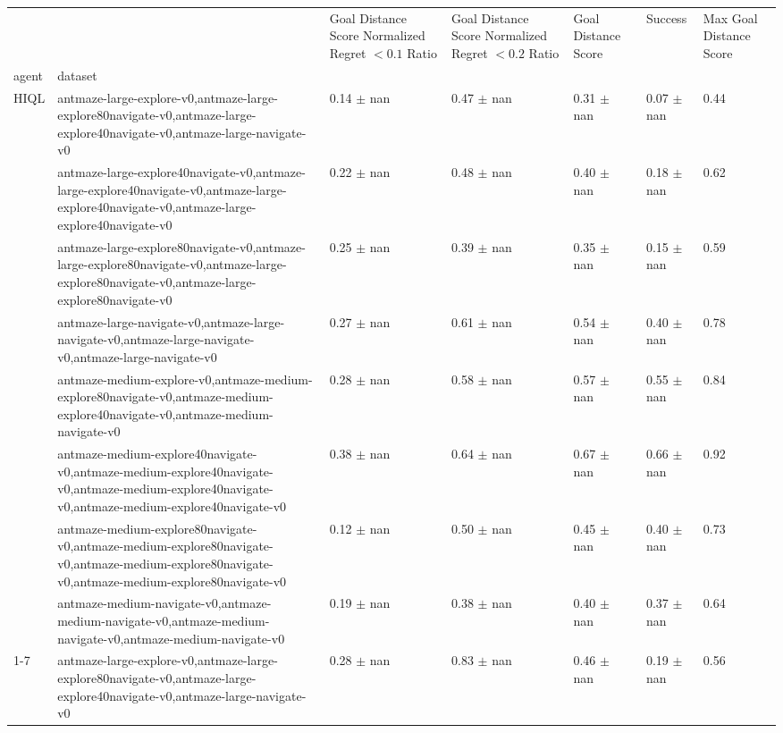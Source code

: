 \begin{tabular}{lllllll}
\toprule
 &  & Goal Distance Score Normalized Regret $< 0.1$ Ratio & Goal Distance Score Normalized Regret $< 0.2$ Ratio & Goal Distance Score & Success & Max Goal Distance Score \\
agent & dataset &  &  &  &  &  \\
\midrule
\multirow[t]{8}{*}{HIQL} & antmaze-large-explore-v0,antmaze-large-explore80navigate-v0,antmaze-large-explore40navigate-v0,antmaze-large-navigate-v0 & 0.14 $\pm$ nan & 0.47 $\pm$ nan & 0.31 $\pm$ nan & 0.07 $\pm$ nan & 0.44 \\
 & antmaze-large-explore40navigate-v0,antmaze-large-explore40navigate-v0,antmaze-large-explore40navigate-v0,antmaze-large-explore40navigate-v0 & 0.22 $\pm$ nan & 0.48 $\pm$ nan & 0.40 $\pm$ nan & 0.18 $\pm$ nan & 0.62 \\
 & antmaze-large-explore80navigate-v0,antmaze-large-explore80navigate-v0,antmaze-large-explore80navigate-v0,antmaze-large-explore80navigate-v0 & 0.25 $\pm$ nan & 0.39 $\pm$ nan & 0.35 $\pm$ nan & 0.15 $\pm$ nan & 0.59 \\
 & antmaze-large-navigate-v0,antmaze-large-navigate-v0,antmaze-large-navigate-v0,antmaze-large-navigate-v0 & 0.27 $\pm$ nan & 0.61 $\pm$ nan & 0.54 $\pm$ nan & 0.40 $\pm$ nan & 0.78 \\
 & antmaze-medium-explore-v0,antmaze-medium-explore80navigate-v0,antmaze-medium-explore40navigate-v0,antmaze-medium-navigate-v0 & 0.28 $\pm$ nan & 0.58 $\pm$ nan & 0.57 $\pm$ nan & 0.55 $\pm$ nan & 0.84 \\
 & antmaze-medium-explore40navigate-v0,antmaze-medium-explore40navigate-v0,antmaze-medium-explore40navigate-v0,antmaze-medium-explore40navigate-v0 & 0.38 $\pm$ nan & 0.64 $\pm$ nan & 0.67 $\pm$ nan & 0.66 $\pm$ nan & 0.92 \\
 & antmaze-medium-explore80navigate-v0,antmaze-medium-explore80navigate-v0,antmaze-medium-explore80navigate-v0,antmaze-medium-explore80navigate-v0 & 0.12 $\pm$ nan & 0.50 $\pm$ nan & 0.45 $\pm$ nan & 0.40 $\pm$ nan & 0.73 \\
 & antmaze-medium-navigate-v0,antmaze-medium-navigate-v0,antmaze-medium-navigate-v0,antmaze-medium-navigate-v0 & 0.19 $\pm$ nan & 0.38 $\pm$ nan & 0.40 $\pm$ nan & 0.37 $\pm$ nan & 0.64 \\
\cline{1-7}
\multirow[t]{8}{*}{QRL} & antmaze-large-explore-v0,antmaze-large-explore80navigate-v0,antmaze-large-explore40navigate-v0,antmaze-large-navigate-v0 & 0.28 $\pm$ nan & 0.83 $\pm$ nan & 0.46 $\pm$ nan & 0.19 $\pm$ nan & 0.56 \\

\end{tabular}
